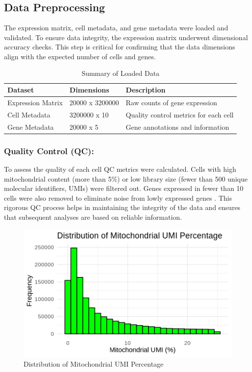 \documentclass[runningheads]{llncs}
\begin{document}
\subsection*{Data Preprocessing}
The expression matrix, cell metadata, and gene metadata were loaded and validated. To ensure data integrity, the expression matrix underwent dimensional accuracy checks. This step is critical for confirming that the data dimensions align with the expected number of cells and genes.

\begin{table}
    \centering
    \begin{tabular}{|l|l|l|}
        \hline
        \textbf{Dataset} & \textbf{Dimensions} & \textbf{Description} \\
        \hline
        Expression Matrix & 20000 x 3200000 & Raw counts of gene expression \\
        \hline
        Cell Metadata & 3200000 x 10 & Quality control metrics for each cell \\
        \hline
        Gene Metadata & 20000 x 5 & Gene annotations and information \\
        \hline
    \end{tabular}
    \caption{Summary of Loaded Data}
    \label{tab:my_label}
\end{table}
\subsubsection{Quality Control (QC):} To assess the quality of each cell QC metrics were calculated. Cells with high mitochondrial content (more than 5\%) or low library size (fewer than 500 unique molecular identifiers, UMIs) were filtered out. Genes expressed in fewer than 10 cells were also removed to eliminate noise from lowly expressed genes \cite{phipson2022propeller}. This rigorous QC process helps in maintaining the integrity of the data and ensures that subsequent analyses are based on reliable information.

\begin{figure}[H]
  \centering
  \includegraphics[height=0.3\textheight]{000018.png}
  \caption{Distribution of Mitochondrial UMI Percentage}
  \label{fig:mito_umi_reduced}
\end{figure}
\end{document}
